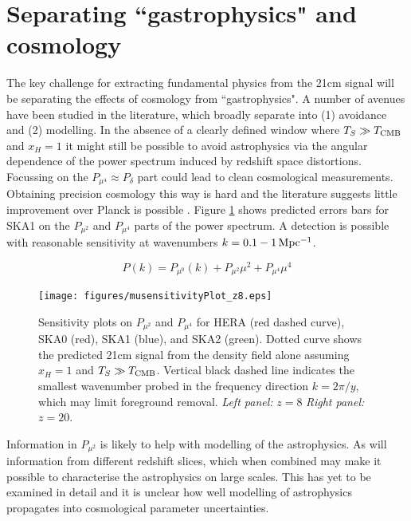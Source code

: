 \documentclass{PoS}
\begin{document}
\section{Separating ``gastrophysics" and cosmology}
\label{sec:separation}

The key challenge for extracting fundamental physics from the 21cm signal will be separating the effects of cosmology from ``gastrophysics". A number of avenues have been studied in the literature, which broadly separate into (1) avoidance and (2) modelling. In the absence of a clearly defined window where $T_S\gg T_{\rm CMB}$ and $x_H=1$ it might still be possible to avoid astrophysics via the angular dependence of the power spectrum induced by redshift space distortions. Focussing on the $P_{\mu^4}\approx P_\delta$ part could lead to clean cosmological measurements. Obtaining precision cosmology this way is hard and the literature suggests little improvement over Planck is possible \citep{2006ApJ...653..815M,2008PhRvD..78b3529M}. Figure \ref{fig:musensitivity} shows predicted errors bars for SKA1 on the $P_{\mu^2}$ and $P_{\mu^4}$ parts of the power spectrum. A detection is possible with reasonable sensitivity at wavenumbers $k=0.1-1{\rm\,Mpc^{-1}}$.

\begin{equation}
P(k)=P_{\mu^0}(k)+P_{\mu^2}\mu^2+P_{\mu^4}\mu^4
\end{equation}


\begin{figure}[htbp]
\begin{center}
\texttt{[image: figures/musensitivityPlot\_z8.eps]}
\caption{Sensitivity plots on $P_{\mu^2}$ and $P_{\mu^4}$ for HERA (red dashed curve), SKA0 (red), SKA1 (blue), and SKA2 (green). Dotted curve shows the predicted 21cm signal from the density field alone assuming $x_H=1$ and $T_S\gg T_{\rm CMB}$. Vertical black dashed line indicates the smallest wavenumber probed in the frequency direction $k=2\pi/y$, which may limit foreground removal.  {\em Left panel:} $z=8$ {\em Right panel:} $z=20$.}
\label{fig:musensitivity}
\end{center}
\end{figure}

Information in $P_{\mu^2}$ is likely to help with modelling of the astrophysics. As will information from different redshift slices, which when combined may make it possible to characterise the astrophysics on large scales. This has yet to be examined in detail and it is unclear how well modelling of astrophysics propagates into cosmological parameter uncertainties.
\end{document}
